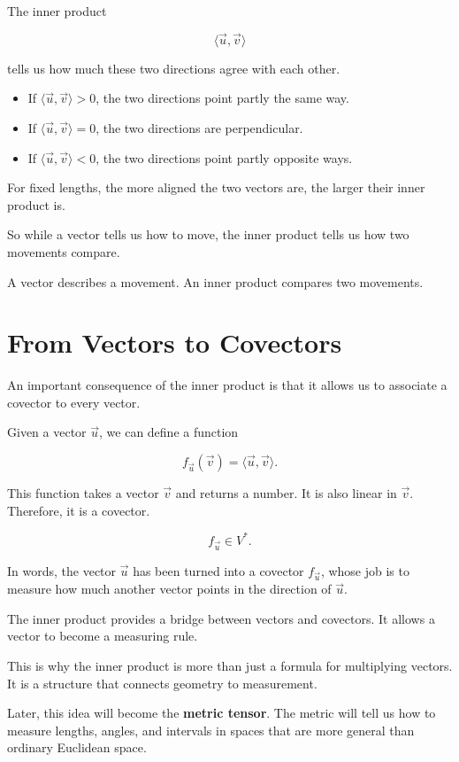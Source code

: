 \documentclass[11pt,openany]{book}
\theoremstyle{definition}
\begin{document}
The inner product

\[
\langle \vec{u},\vec{v}\rangle
\]

tells us how much these two directions agree with each other.

\begin{itemize}
  \item If \(\langle \vec{u},\vec{v}\rangle > 0\), the two directions point partly
  the same way.
  \item If \(\langle \vec{u},\vec{v}\rangle = 0\), the two directions are
  perpendicular.
  \item If \(\langle \vec{u},\vec{v}\rangle < 0\), the two directions point partly
  opposite ways.
\end{itemize}

For fixed lengths, the more aligned the two vectors are, the larger their inner
product is.

\medskip

So while a vector tells us how to move, the inner product tells us how two
movements compare.

\begin{keyidea}
A vector describes a movement. An inner product compares two movements.
\end{keyidea}

\section{From Vectors to Covectors}

An important consequence of the inner product is that it allows us to associate
a covector to every vector.

Given a vector \(\vec{u}\), we can define a function

\[
f_{\vec{u}}(\vec{v})
=
\langle \vec{u},\vec{v}\rangle.
\]

This function takes a vector \(\vec{v}\) and returns a number. It is also linear
in \(\vec{v}\). Therefore, it is a covector.

\[
f_{\vec{u}} \in V^*.
\]

In words, the vector \(\vec{u}\) has been turned into a covector
\(f_{\vec{u}}\), whose job is to measure how much another vector points in the
direction of \(\vec{u}\).

\begin{keyidea}
The inner product provides a bridge between vectors and covectors. It allows a
vector to become a measuring rule.
\end{keyidea}

This is why the inner product is more than just a formula for multiplying
vectors. It is a structure that connects geometry to measurement.

Later, this idea will become the \textbf{metric tensor}. The metric will tell us
how to measure lengths, angles, and intervals in spaces that are more general
than ordinary Euclidean space.
\end{document}

